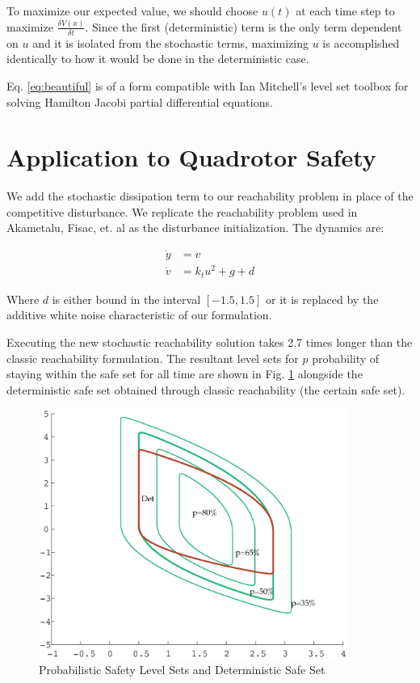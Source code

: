 \documentclass[a4paper]{article}
\begin{document}
To maximize our expected value, we should choose $u(t)$ at each time step to maximize $\frac{\delta V(x)}{\delta t}$.
Since the first (deterministic) term is the only term dependent on $u$ and it is isolated from the stochastic terms, maximizing $u$ is accomplished identically to how it would be done in the deterministic case.

Eq. \ref{eq:beautiful} is of a form compatible with Ian Mitchell's level set toolbox for solving Hamilton Jacobi partial differential equations.

\section{Application to Quadrotor Safety}
We add the stochastic dissipation term to our reachability problem in place of the competitive disturbance.
We replicate the reachability problem used in Akametalu, Fisac, et. al \cite{KeneJaime} as the disturbance initialization.
The dynamics are:

\begin{align}
  \dot{y} &= v
\\\dot{v} &= k_t u^2 + g + d
\end{align}

Where $d$ is either bound in the interval $[-1.5, 1.5]$ or it is replaced by the additive white noise characteristic of our formulation.

Executing the new stochastic reachability solution takes 2.7 times longer than the classic reachability formulation.
The resultant level sets for $p$ probability of staying within the safe set for all time are shown in Fig. \ref{fig:ResultLevels} alongside the deterministic safe set obtained through classic reachability (the certain safe set).

\begin{figure}[h!]
  \centering
  \includegraphics[width=0.9\textwidth]{safetyCompareLabel.eps}
  \caption{Probabilistic Safety Level Sets and Deterministic Safe Set}
  \label{fig:ResultLevels}
\end{figure}
\end{document}
